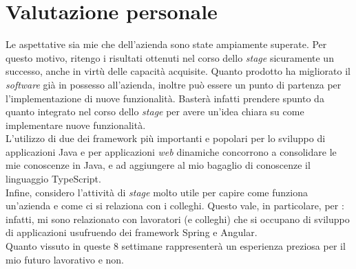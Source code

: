 \section{Valutazione personale}
Le aspettative sia mie che dell'azienda sono state ampiamente superate. Per
questo motivo, ritengo i risultati ottenuti nel corso dello \textit{stage}
sicuramente un successo, anche in virtù delle capacità acquisite. Quanto
prodotto ha migliorato il \textit{software} già in possesso all'azienda,
inoltre può
essere un punto di partenza per l'implementazione di nuove funzionalità.
Basterà infatti prendere spunto da quanto integrato nel corso dello
\textit{stage} per avere un'idea chiara su come implementare nuove
funzionalità. \\
L'utilizzo di due dei \gls{framework} più importanti e popolari per lo sviluppo
di applicazioni Java e per applicazioni \textit{web} dinamiche concorrono a
consolidare le mie conoscenze in Java, e ad aggiungere al mio bagaglio di
conoscenze il linguaggio TypeScript.  \\
Infine, considero l'attività di \textit{stage} molto utile per capire come
funziona un'azienda e come ci si relaziona con i colleghi. Questo vale, in
particolare, per \myCompany: infatti, mi sono relazionato con lavoratori (e
colleghi) che si occupano di sviluppo di applicazioni usufruendo dei
\gls{framework} Spring e Angular.\\
Quanto vissuto in queste 8 settimane rappresenterà un esperienza
preziosa per il mio futuro lavorativo e non.